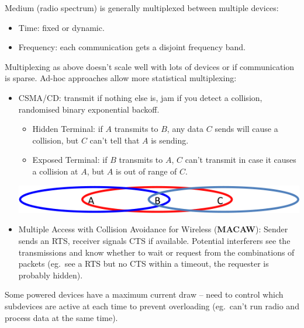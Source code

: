 \documentclass[a4paper, 11pt]{article}
\begin{document}
{    Medium (radio spectrum) is generally multiplexed between multiple devices:
    \begin{itemize}
    \item Time: fixed or dynamic.
    \item Frequency: each communication gets a disjoint frequency band.
    \end{itemize}

    Multiplexing as above doesn't scale well with lots of devices or if communication is sparse. Ad-hoc approaches allow more statistical multiplexing:
    \begin{itemize}
    \item
    {
        CSMA/CD: transmit if nothing else is, jam if you detect a collision, randomised binary exponential backoff.

        \begin{minipage}[t]{0.65\textwidth}
        \setlength{\parskip}{8pt}
        \begin{itemize}
        \item Hidden Terminal: if \(A\) transmits to \(B\), any data \(C\) sends will cause a collision, but \(C\) can't tell that \(A\) is sending.
        \item Exposed Terminal: if \(B\) transmits to \(A\), \(C\) can't transmit in case it causes a collision at \(A\), but \(A\) is out of range of \(C\).
        \end{itemize}
        \end{minipage}
        \hspace{3mm}
        \begin{minipage}[t]{0.25\textwidth}
        \vspace{2mm}
        \centering
        \includegraphics[width=\textwidth]{terminals.png}
        \end{minipage}
    }
    \item
    {
        Multiple Access with Collision Avoidance for Wireless (\textbf{MACAW}): Sender sends an RTS, receiver signals CTS if available. Potential interferers see the transmissions and know whether to wait or request from the combinations of packets (eg.\ see a RTS but no CTS within a timeout, the requester is probably hidden).
    }
    \end{itemize}

    Some powered devices have a maximum current draw -- need to control which subdevices are active at each time to prevent overloading (eg.\ can't run radio and process data at the same time).
}
\end{document}
